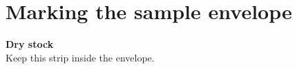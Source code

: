 \documentclass{article}
\begin{document}
\section*{Marking the sample envelope}

\noindent\colorbox{yellow!25}{\parbox{.42\linewidth}{\textbf{Dry stock}\\Keep this strip inside the envelope.}}
\hfill{}
\end{document}
